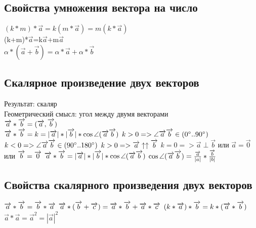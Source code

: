 \documentclass{book}
\begin{document}
\subsection{Свойства умножения вектора на число}
$(k*m)*\overrightarrow{a}=k(m*\overrightarrow{a})=m(k*\overrightarrow{a})$\\
(k+m)*$\overrightarrow{a}$=k$\overrightarrow{a}$+m$\overrightarrow{a}$\\
$\alpha*(\overrightarrow{a}+\overrightarrow{b})=\alpha*\overrightarrow{a}+\alpha*\overrightarrow{b}$

\subsection{Скалярное произведение двух векторов}
Результат: скаляр\\
Геометрический смысл: угол между двумя векторами\\
$\overrightarrow{a}*\overrightarrow{b}=(\overrightarrow{a},\overrightarrow{b})\\$
\\
$\overrightarrow{a}*\overrightarrow{b}=k=|\overrightarrow{a}|*|\overrightarrow{b}|*\cos\angle(\overrightarrow{a}\overrightarrow{b})\\$
$k>0 =>  \angle\overrightarrow{a}\overrightarrow{b}\in(0^\circ..90^\circ)\\$
$k<0 =>  \angle\overrightarrow{a}\overrightarrow{b}\in(90^\circ..180^\circ)\\$
$k>0 => \overrightarrow{a}\uparrow\uparrow\overrightarrow{b}\\$
$k=0 => \overrightarrow{a}\perp\overrightarrow{b}$ или $\overrightarrow{a}=\overrightarrow{0}$ или $\overrightarrow{b}=\overrightarrow{0}\\$
$\overrightarrow{a}*\overrightarrow{b}=|\overrightarrow{a}|*|\overrightarrow{b}|*\cos\angle(\overrightarrow{a}\overrightarrow{b})\\$
$\cos\angle(\overrightarrow{a}\overrightarrow{b}) = \frac{\overrightarrow{a}}{|a|}*\frac{\overrightarrow{b}}{|b|}\\$
\subsection{Свойства скалярного произведения двух векторов}
$\overrightarrow{a}*\overrightarrow{b}=\overrightarrow{b}*\overrightarrow{a}\\$
$\overrightarrow{a}*(\overrightarrow{b}+\overrightarrow{c})=\overrightarrow{a}*\overrightarrow{b}+\overrightarrow{a}*\overrightarrow{c}\\$
$(k*\overrightarrow{a})*\overrightarrow{b}=k*(\overrightarrow{a}*\overrightarrow{b})\\$
$\overrightarrow{a}*\overrightarrow{a}=\overrightarrow{a}^2=|\overrightarrow{a}|^2$
\end{document}

